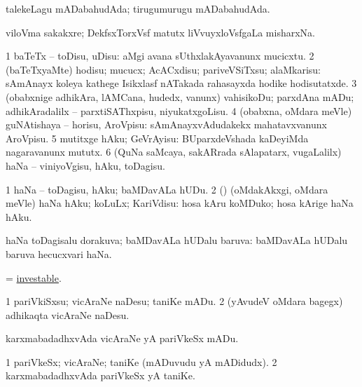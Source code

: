 \bentry
{}
\gl{\gu}
\bmng
talekeLagu mADabahudAda; tirugumurugu mADabahudAda. 
\emng
\eentry

\bentry
{}
\gl{\nA}
\bmng
viloVma sakakxre; DekfsxTorxVsf matutx liVvuyxloVsfgaLa misharxNa. 
\emng
\eentry

\bentry
{}
\gl{\sakirx}
\bmng
\bnum
\num{1} baTeTx -- toDisu, uDisu:  aMgi avana sUthxlakAyavanunx mucicxtu. 
\num{2} (baTeTxyaMte) hodisu; mucucx; AcACxdisu; pariveVSiTxsu; alaMkarisu:  sAmAnayx koleya kathege Isikxlasf nATakada rahasayxda hodike hodisutatxde. 
\num{3} (obabxnige adhikAra, lAMCana, hudedx, \mo vanunx) vahisikoDu; parxdAna mADu; adhikAradalilx -- parxtiSAThxpisu, niyukatxgoLisu. 
\num{4} (obabxna, oMdara meVle) guNAtishaya -- horisu, AroVpisu:  sAmAnayxvAdudakekx mahatavxvanunx AroVpisu. 
\num{5} mutitxge hAku; GeVrAyisu:  BUparxdeVshada kaDeyiMda nagaravanunx mututx. 
\num{6} (QuNa saMcaya, sakARrada sAlapatarx, \mo vugaLalilx) haNa -- viniyoVgisu, hAku, toDagisu. 
\enum
\emng

\noindent 
\gl{\akirx}
\bmng
\bnum
\num{1} haNa -- toDagisu, hAku; baMDavALa hUDu. 
\num{2} (\AmA) (oMdakAkxgi, oMdara meVle) haNa hAku; koLuLx; KariVdisu:  hosa kAru koMDuko; hosa kArige haNa hAku. 
\enum
\emng
\eentry

\bentry
{}
\gl{\gu}
\bmng
haNa toDagisalu dorakuva; baMDavALa hUDalu baruva:  baMDavALa hUDalu baruva hecucxvari haNa. 
\emng
\eentry

\bentry
{}
\gl{\gu}
\bmng
= \hyperlink{investable}{investable}. 
\emng
\eentry

\bentry
{}
\gl{\sakirx}
\bmng
\bnum
\num{1} pariVkiSxsu; vicAraNe naDesu; taniKe mADu. 
\num{2} (yAvudeV oMdara bagegx) adhikaqta vicAraNe naDesu. 
\enum
\emng

\noindent 
\gl{\akirx}
\bmng
karxmabadadhxvAda vicAraNe yA pariVkeSx mADu. 
\emng
\eentry

\bentry
{}
\gl{\nA}
\bmng
\bnum
\num{1} pariVkeSx; vicAraNe; taniKe (mADuvudu yA mADidudx). 
\num{2} karxmabadadhxvAda pariVkeSx yA taniKe. 
\enum
\emng
\eentry

